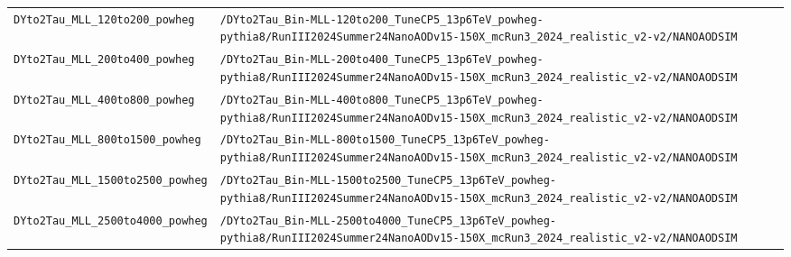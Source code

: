 \begin{longtable}{@{}>{\RaggedRight\arraybackslash}p{} >{\RaggedRight\arraybackslash}p{}@{}}
\addlinespace[2pt]
\texttt{DYto2Tau\_\allowbreak{}MLL\_\allowbreak{}120to200\_\allowbreak{}powheg} & \texttt{/\allowbreak{}DYto2Tau\_\allowbreak{}Bin-\allowbreak{}MLL-\allowbreak{}120to200\_\allowbreak{}TuneCP5\_\allowbreak{}13p6TeV\_\allowbreak{}powheg-\allowbreak{}pythia8/\allowbreak{}RunIII2024Summer24NanoAODv15-\allowbreak{}150X\_\allowbreak{}mcRun3\_\allowbreak{}2024\_\allowbreak{}realistic\_\allowbreak{}v2-\allowbreak{}v2/\allowbreak{}NANOAODSIM} \\
\addlinespace[2pt]
\texttt{DYto2Tau\_\allowbreak{}MLL\_\allowbreak{}200to400\_\allowbreak{}powheg} & \texttt{/\allowbreak{}DYto2Tau\_\allowbreak{}Bin-\allowbreak{}MLL-\allowbreak{}200to400\_\allowbreak{}TuneCP5\_\allowbreak{}13p6TeV\_\allowbreak{}powheg-\allowbreak{}pythia8/\allowbreak{}RunIII2024Summer24NanoAODv15-\allowbreak{}150X\_\allowbreak{}mcRun3\_\allowbreak{}2024\_\allowbreak{}realistic\_\allowbreak{}v2-\allowbreak{}v2/\allowbreak{}NANOAODSIM} \\
\addlinespace[2pt]
\texttt{DYto2Tau\_\allowbreak{}MLL\_\allowbreak{}400to800\_\allowbreak{}powheg} & \texttt{/\allowbreak{}DYto2Tau\_\allowbreak{}Bin-\allowbreak{}MLL-\allowbreak{}400to800\_\allowbreak{}TuneCP5\_\allowbreak{}13p6TeV\_\allowbreak{}powheg-\allowbreak{}pythia8/\allowbreak{}RunIII2024Summer24NanoAODv15-\allowbreak{}150X\_\allowbreak{}mcRun3\_\allowbreak{}2024\_\allowbreak{}realistic\_\allowbreak{}v2-\allowbreak{}v2/\allowbreak{}NANOAODSIM} \\
\addlinespace[2pt]
\texttt{DYto2Tau\_\allowbreak{}MLL\_\allowbreak{}800to1500\_\allowbreak{}powheg} & \texttt{/\allowbreak{}DYto2Tau\_\allowbreak{}Bin-\allowbreak{}MLL-\allowbreak{}800to1500\_\allowbreak{}TuneCP5\_\allowbreak{}13p6TeV\_\allowbreak{}powheg-\allowbreak{}pythia8/\allowbreak{}RunIII2024Summer24NanoAODv15-\allowbreak{}150X\_\allowbreak{}mcRun3\_\allowbreak{}2024\_\allowbreak{}realistic\_\allowbreak{}v2-\allowbreak{}v2/\allowbreak{}NANOAODSIM} \\
\addlinespace[2pt]
\texttt{DYto2Tau\_\allowbreak{}MLL\_\allowbreak{}1500to2500\_\allowbreak{}powheg} & \texttt{/\allowbreak{}DYto2Tau\_\allowbreak{}Bin-\allowbreak{}MLL-\allowbreak{}1500to2500\_\allowbreak{}TuneCP5\_\allowbreak{}13p6TeV\_\allowbreak{}powheg-\allowbreak{}pythia8/\allowbreak{}RunIII2024Summer24NanoAODv15-\allowbreak{}150X\_\allowbreak{}mcRun3\_\allowbreak{}2024\_\allowbreak{}realistic\_\allowbreak{}v2-\allowbreak{}v2/\allowbreak{}NANOAODSIM} \\
\addlinespace[2pt]
\texttt{DYto2Tau\_\allowbreak{}MLL\_\allowbreak{}2500to4000\_\allowbreak{}powheg} & \texttt{/\allowbreak{}DYto2Tau\_\allowbreak{}Bin-\allowbreak{}MLL-\allowbreak{}2500to4000\_\allowbreak{}TuneCP5\_\allowbreak{}13p6TeV\_\allowbreak{}powheg-\allowbreak{}pythia8/\allowbreak{}RunIII2024Summer24NanoAODv15-\allowbreak{}150X\_\allowbreak{}mcRun3\_\allowbreak{}2024\_\allowbreak{}realistic\_\allowbreak{}v2-\allowbreak{}v2/\allowbreak{}NANOAODSIM} \\

\end{longtable}
